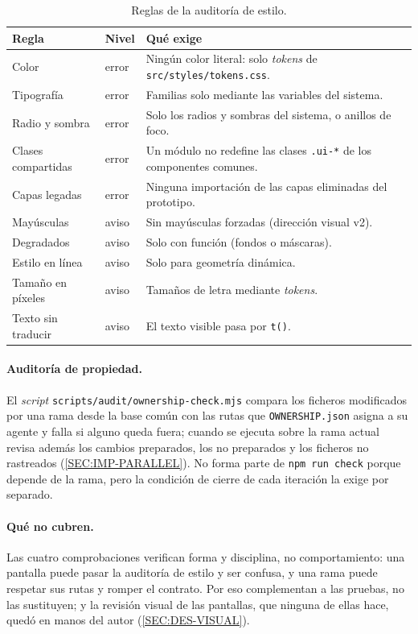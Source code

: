 \begin{table}[htbp]
  \centering
  \small
  \begin{tabular}{p{}p{}p{}}
    \toprule
    \textbf{Regla} & \textbf{Nivel} & \textbf{Qué exige} \\
    \midrule
    Color & error & Ningún color literal: solo \textit{tokens} de
      \texttt{src/styles/tokens.css}. \\
    Tipografía & error & Familias solo mediante las variables del sistema. \\
    Radio y sombra & error & Solo los radios y sombras del sistema, o anillos de foco. \\
    Clases compartidas & error & Un módulo no redefine las clases \texttt{.ui-*} de los
      componentes comunes. \\
    Capas legadas & error & Ninguna importación de las capas eliminadas del prototipo. \\
    Mayúsculas & aviso & Sin mayúsculas forzadas (dirección visual v2). \\
    Degradados & aviso & Solo con función (fondos o máscaras). \\
    Estilo en línea & aviso & Solo para geometría dinámica. \\
    Tamaño en píxeles & aviso & Tamaños de letra mediante \textit{tokens}. \\
    Texto sin traducir & aviso & El texto visible pasa por \texttt{t()}. \\
    \bottomrule
  \end{tabular}
  \caption{Reglas de la auditoría de estilo.\label{TAB:TEST-STYLE}}
\end{table}

\paragraph{Auditoría de propiedad.} El \textit{script}
\texttt{scripts/audit/ownership-check.mjs} compara los ficheros modificados por una rama
desde la base común con las rutas que \texttt{OWNERSHIP.json} asigna a su agente y falla si
alguno queda fuera; cuando se ejecuta sobre la rama actual revisa además los cambios
preparados, los no preparados y los ficheros no rastreados (\cref{SEC:IMP-PARALLEL}). No
forma parte de \texttt{npm run check} porque depende de la rama, pero la condición de cierre
de cada iteración la exige por separado.

\paragraph{Qué no cubren.} Las cuatro comprobaciones verifican forma y disciplina, no
comportamiento: una pantalla puede pasar la auditoría de estilo y ser confusa, y una rama
puede respetar sus rutas y romper el contrato. Por eso complementan a las pruebas, no las
sustituyen; y la revisión visual de las pantallas, que ninguna de ellas hace, quedó en manos
del autor (\cref{SEC:DES-VISUAL}).
